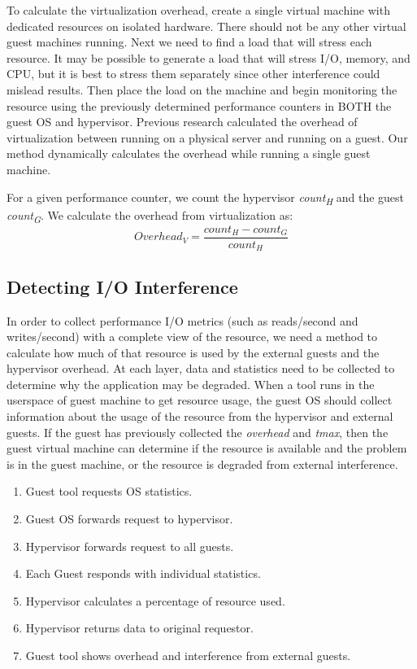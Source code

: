 \indent To calculate the virtualization overhead, create a single virtual machine with dedicated resources on isolated hardware.  There should not be any other virtual guest machines running.  Next we need to find a load that will stress each resource.  It may be possible to generate a load that will stress I/O, memory, and CPU, but it is best to stress them separately since other interference could mislead results.  Then place the load on the machine and begin monitoring the resource using the previously determined performance counters in BOTH the guest OS and hypervisor. Previous research calculated the overhead of virtualization between running on a physical server and running on a guest.  Our method dynamically calculates the overhead while running a single guest machine.

\indent For a given performance counter, we count the hypervisor \emph{count\textsubscript{H}} and the guest \emph{count\textsubscript{G}}.  We calculate the overhead from virtualization as:
\[ Overhead_V = \frac{count_H - count_G}{count_H} \]


\subsection{Detecting I/O Interference}
In order to collect performance I/O metrics (such as reads/second and writes/second) with a complete view of the resource, we need a method to calculate how much of that resource is used by the external guests and the hypervisor overhead.  At each layer, data and statistics need to be collected to determine why the application may be degraded.
\indent When a tool runs in the userspace of guest machine to get resource usage, the guest OS should collect information about the usage of the resource from the hypervisor and external guests.  If the guest has previously collected the  \emph{overhead} and \emph{tmax}, then the guest virtual machine can determine if the resource is available and the problem is in the guest machine, or the resource is degraded from external interference.

\begin{enumerate}
	\item Guest tool requests OS statistics.
	\item Guest OS forwards request to hypervisor.
	\item Hypervisor forwards request to all guests.
	\item Each Guest responds with individual statistics.
	\item Hypervisor calculates a percentage of resource used.
	\item Hypervisor returns data to original requestor.
	\item Guest tool shows overhead and interference from external guests.
\end{enumerate}

